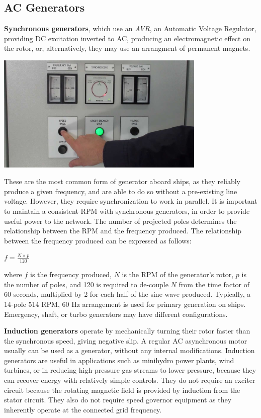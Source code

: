 \documentclass[11pt,a4paper]{article}
\begin{document}
\subsection{AC Generators}
\textbf{Synchronous generators}, which use an \textit{AVR}, an Automatic Voltage Regulator, providing DC excitation inverted to AC, producing an electromagnetic effect on the rotor, or, alternatively, they may use an arrangment of permanent magnets.
\begin{center}
\includegraphics[width=10cm]{sync.jpg}
\end{center}
These are the most common form of generator aboard ships, as they reliably produce a given frequency, and are able to do so without a pre-existing line voltage. However, they require synchronization to work in parallel. It is important to maintain a consistent RPM with synchronous generators, in order to provide useful power to the network. The number of projected poles determines the relationship between the RPM and the frequency produced. The relationship between the frequency produced can be expressed as follows:

$f=\frac{N\times p}{120}$

where $f$ is the frequency produced, $N$ is the RPM of the generator's rotor, $p$ is the number of poles, and 120 is required to de-couple $N$ from the time factor of 60 seconds, multiplied by 2 for each half of the sine-wave produced. Typically, a 14-pole 514 RPM, 60 Hz arrangement is used for primary generation on ships. Emergency, shaft, or turbo generators may have different configurations.

\textbf{Induction generators} operate by mechanically turning their rotor faster than the synchronous speed, giving negative slip. A regular AC asynchronous motor usually can be used as a generator, without any internal modifications. Induction generators are useful in applications such as minihydro power plants, wind turbines, or in reducing high-pressure gas streams to lower pressure, because they can recover energy with relatively simple controls. They do not require an exciter circuit because the rotating magnetic field is provided by induction from the stator circuit. They also do not require speed governor equipment as they inherently operate at the connected grid frequency.
\end{document}

